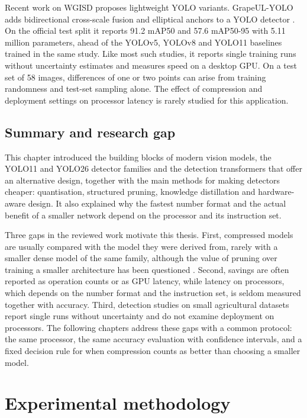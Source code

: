 \documentclass[a4paper,11pt,twoside]{report}
\theoremstyle{definition}
\begin{document}
Recent work on WGISD proposes lightweight YOLO variants. GrapeUL-YOLO adds bidirectional cross-scale fusion and elliptical anchors to a YOLO detector \cite{Zhu2026GrapeULYOLO}. On the official test split it reports 91.2 mAP50 and 57.6 mAP50-95 with 5.11 million parameters, ahead of the YOLOv5, YOLOv8 and YOLO11 baselines trained in the same study. Like most such studies, it reports single training runs without uncertainty estimates and measures speed on a desktop GPU. On a test set of 58 images, differences of one or two points can arise from training randomness and test-set sampling alone. The effect of compression and deployment settings on processor latency is rarely studied for this application.

\section{Summary and research gap}
\label{sec:rw_summary}

This chapter introduced the building blocks of modern vision models, the YOLO11 and YOLO26 detector families and the detection transformers that offer an alternative design, together with the main methods for making detectors cheaper: quantisation, structured pruning, knowledge distillation and hardware-aware design. It also explained why the fastest number format and the actual benefit of a smaller network depend on the processor and its instruction set.

Three gaps in the reviewed work motivate this thesis. First, compressed models are usually compared with the model they were derived from, rarely with a smaller dense model of the same family, although the value of pruning over training a smaller architecture has been questioned \cite{Liu2019RethinkingPruning, Blalock2020StatePruning}. Second, savings are often reported as operation counts or as GPU latency, while latency on processors, which depends on the number format and the instruction set, is seldom measured together with accuracy. Third, detection studies on small agricultural datasets report single runs without uncertainty and do not examine deployment on processors. The following chapters address these gaps with a common protocol: the same processor, the same accuracy evaluation with confidence intervals, and a fixed decision rule for when compression counts as better than choosing a smaller model.


\chapter{Experimental methodology}
\end{document}

